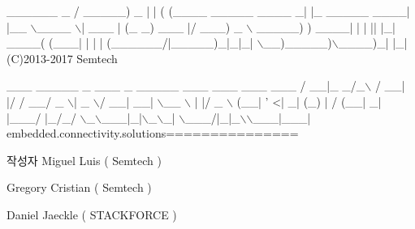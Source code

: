 \begin{DoxyCode}
  \_\_\_\_\_\_                              \_
 / \_\_\_\_\_)             \_              | |
( (\_\_\_\_  \_\_\_\_\_ \_\_\_\_ \_| |\_ \_\_\_\_\_  \_\_\_\_| |\_\_
 \(\backslash\)\_\_\_\_ \(\backslash\)| \_\_\_ |    (\_   \_) \_\_\_ |/ \_\_\_)  \_ \(\backslash\)
 \_\_\_\_\_) ) \_\_\_\_| | | || |\_| \_\_\_\_( (\_\_\_| | | |
(\_\_\_\_\_\_/|\_\_\_\_\_)\_|\_|\_| \(\backslash\)\_\_)\_\_\_\_\_)\(\backslash\)\_\_\_\_)\_| |\_|
(C)2013-2017 Semtech

 \_\_\_ \_\_\_\_\_ \_   \_\_\_ \_  \_\_\_\_\_ \_\_\_  \_\_\_  \_\_\_ \_\_\_
/ \_\_|\_   \_/\_\(\backslash\) / \_\_| |/ / \_\_/ \_ \(\backslash\)| \_ \(\backslash\)/ \_\_| \_\_|
\(\backslash\)\_\_ \(\backslash\) | |/ \_ \(\backslash\) (\_\_| \textcolor{stringliteral}{' <| \_| (\_) |   / (\_\_| \_|}
\textcolor{stringliteral}{|\_\_\_/ |\_/\_/ \(\backslash\)\_\(\backslash\)\_\_\_|\_|\(\backslash\)\_\(\backslash\)\_| \(\backslash\)\_\_\_/|\_|\_\(\backslash\)\(\backslash\)\_\_\_|\_\_\_|}
\textcolor{stringliteral}{embedded.connectivity.solutions===============}
\end{DoxyCode}


\begin{DoxyAuthor}{작성자}
Miguel Luis ( Semtech )

Gregory Cristian ( Semtech )

Daniel Jaeckle ( S\+T\+A\+C\+K\+F\+O\+R\+CE ) 
\end{DoxyAuthor}
